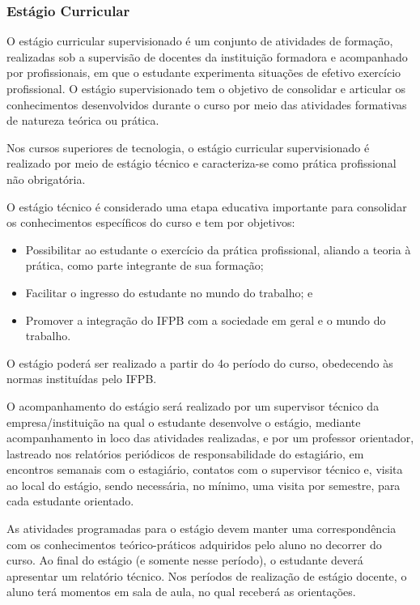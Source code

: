 \subsubsection{Estágio Curricular}

O estágio curricular supervisionado é um conjunto de atividades de formação, realizadas sob a supervisão de docentes da instituição formadora e acompanhado por profissionais, em que o estudante experimenta situações de efetivo exercício profissional. O estágio supervisionado tem o objetivo de consolidar e articular os conhecimentos desenvolvidos durante o curso por meio das atividades formativas de natureza teórica ou prática.

Nos cursos superiores de tecnologia, o estágio curricular supervisionado é realizado por meio de estágio técnico e caracteriza-se como prática profissional não obrigatória.

O estágio técnico é considerado uma etapa educativa importante para consolidar os conhecimentos específicos do curso e tem por objetivos:

\begin{itemize}
	\item Possibilitar ao estudante o exercício da prática profissional, aliando a teoria à prática, como parte integrante de sua formação;
	\item Facilitar o ingresso do estudante no mundo do trabalho; e
	\item Promover a integração do IFPB com a sociedade em geral e o mundo do trabalho.
\end{itemize}
	
O estágio poderá ser realizado a partir do 4o período do curso, obedecendo às normas instituídas pelo IFPB.

O acompanhamento do estágio será realizado por um supervisor técnico da empresa/instituição na qual o estudante desenvolve o estágio, mediante acompanhamento in loco das atividades realizadas, e por um professor orientador, lastreado nos relatórios periódicos de responsabilidade do estagiário, em encontros semanais com o estagiário, contatos com o supervisor técnico e, visita ao local do estágio, sendo necessária, no mínimo, uma visita por semestre, para cada estudante orientado.

As atividades programadas para o estágio devem manter uma correspondência com os conhecimentos teórico-práticos adquiridos pelo aluno no decorrer do curso. Ao final do estágio (e somente nesse período), o estudante deverá apresentar um relatório técnico. Nos períodos de realização de estágio docente, o aluno terá momentos em sala de aula, no qual receberá as orientações.

